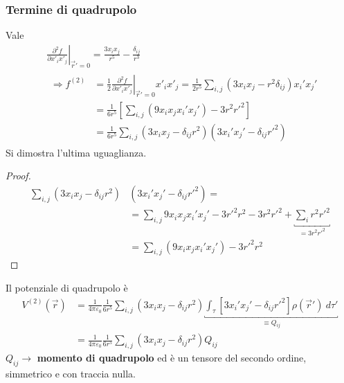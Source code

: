 \documentclass[10pt, a4paper]{scrartcl}
\newcommand*\Eval[3]{\left.#1\right\rvert_{#2}^{#3}}
\numberwithin{equation}{subsection}
\theoremstyle{style1}
\newenvironment{boxenv}[1][]{
    \begin{eqbox}[#1]
    }{
   \end{eqbox}
}
\begin{document}
\subsubsection{Termine di quadrupolo}
Vale
\begin{equation}
	\begin{split}
		&\Eval{\frac{\partial ^2f}{\partial x'_ix'_j} }{\vec{r}' =0}{} = \frac{3 x_i x_j}{r^5} - \frac{\delta _{ij} }{r^3}\\
		&\begin{split}
			\Rightarrow f^{(2)} &= \frac{1}{2}\Eval{\frac{\partial ^2f}{\partial x'_ix'_j} }{\vec{r}' =0}{} x'_i x'_j =\frac{1}{2r^5} \sum_{i,j}^{} (3x_{i} x_j - r^2 \delta _{ij} ) x_i' x_j'\\
					    &=\frac{1}{6r^5}\left[ \sum_{i,j}^{} (9x_ix_jx_i'x_j') - 3r^2r'^2 \right] \\
					    &=\frac{1}{6r^5}\sum_{i,j}^{} \left(3x_i x_j - \delta _{ij} r^2\right) \left(3x_i'x_j' - \delta _{ij} r'^2\right) 
		\end{split}
	\end{split}
\end{equation}
Si dimostra l'ultima uguaglianza.
\begin{boxenv}[]
\begin{proof}
	\begin{equation}
		\begin{split}
			\sum_{i,j}^{} \left(3x_i x_j - \delta _{ij} r^2\right) &\left(3x_i'x_j' - \delta _{ij} r'^2\right) =\\
									       &= \sum_{i,j}^{} 9x_ix_jx_i'x_j' - 3r'^2 r^2 - 3r^2 r'^2 + \underbracket{\sum_{i}^{} r^2 r'^2}_{=3r^2 r'^2} \\
			&=\sum_{i,j}^{} (9x_ix_jx_i'x_j') - 3 r'^2 r^2
		\end{split}
	\end{equation}
\end{proof}
\end{boxenv}
\noindent Il potenziale di quadrupolo \`e
\begin{equation}
	\begin{split}
		V^{(2)} (\vec{r}) &= \frac{1}{4\pi \varepsilon _0}\frac{1}{6r^5} \sum_{i,j}^{} \left(3x_ix_j - \delta _{ij} r^2\right) \underbracket{\int_{\tau } \left[ 3x_i'x_j' - \delta _{ij} r'^2 \right] \rho (\vec{r}') \ d\tau '}_{\equiv Q_{ij} } \\
				  &=\frac{1}{4\pi \varepsilon _0}\frac{1}{6r^5} \sum_{i,j}^{} \left(3x_ix_j - \delta _{ij} r^2\right)Q_{ij} 
	\end{split}
\end{equation}
$Q_{ij} \to $ \textbf{momento di quadrupolo} ed \`e un tensore del secondo ordine, simmetrico e con traccia nulla. 
\end{document}
